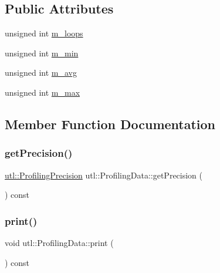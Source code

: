 \subsection*{Public Attributes}
\begin{DoxyCompactItemize}
\item 
unsigned int \mbox{\hyperlink{structutl_1_1_profiling_data_a1262c85d877f95e243991d5d82e8aa3f}{m\+\_\+loops}}
\item 
unsigned int \mbox{\hyperlink{structutl_1_1_profiling_data_a61e7406f3b528d1740ce266673cc725b}{m\+\_\+min}}
\item 
unsigned int \mbox{\hyperlink{structutl_1_1_profiling_data_aa37adf9f2cd78f78d581b1bf12130910}{m\+\_\+avg}}
\item 
unsigned int \mbox{\hyperlink{structutl_1_1_profiling_data_a5590a66a5ce2b5850ca8053ce62b4edc}{m\+\_\+max}}
\end{DoxyCompactItemize}


\subsection{Member Function Documentation}
\mbox{\label{structutl_1_1_profiling_data_a81bcb78d3bb5fdb2ef0e100e44fed249}} 
\subsubsection{\texorpdfstring{get\+Precision()}{getPrecision()}}
{\footnotesize\ttfamily \mbox{\hyperlink{namespaceutl_ad221bb3fac593651670bdc0263b92707}{utl\+::\+Profiling\+Precision}} utl\+::\+Profiling\+Data\+::get\+Precision (\begin{DoxyParamCaption}{ }\end{DoxyParamCaption}) const}

\mbox{\label{structutl_1_1_profiling_data_abf6ff992cd66ef1ad903afc3d3057d2e}} 
\subsubsection{\texorpdfstring{print()}{print()}}
{\footnotesize\ttfamily void utl\+::\+Profiling\+Data\+::print (\begin{DoxyParamCaption}{ }\end{DoxyParamCaption}) const}


